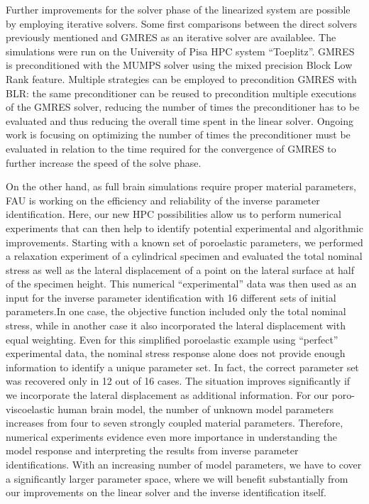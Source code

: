 \documentclass[a4paper,12pt, numbers]{article}
\begin{document}
Further improvements for the solver phase of the linearized system are possible by employing iterative solvers. Some first comparisons between the direct solvers previously mentioned and GMRES as an iterative solver are availablee. The simulations were run on the University of Pisa HPC system ``Toeplitz''. GMRES is preconditioned with the MUMPS solver using the mixed precision Block Low Rank feature. Multiple strategies can be employed to precondition GMRES with BLR: the same preconditioner can be reused to precondition multiple executions of the GMRES solver, reducing the number of times the preconditioner has to be evaluated and thus reducing the overall time spent in the linear solver. Ongoing work is focusing on optimizing the number of times the preconditioner must be evaluated in relation to the time required for the convergence of GMRES to further increase the speed of the solve phase.

On the other hand, as full brain simulations require proper material parameters, FAU is working on the efficiency and reliability of the inverse parameter identification. Here, our new HPC possibilities allow us to perform numerical experiments that can then help to identify potential experimental and algorithmic improvements.  Starting with a known set of poroelastic parameters, we performed a relaxation experiment of a cylindrical specimen and evaluated the total nominal stress as well as the lateral displacement of a point on the lateral surface at half of the specimen height. This numerical ``experimental'' data was then used as an input for the inverse parameter identification with 16 different sets of initial parameters.In one case, the objective function included only the total nominal stress, while in another case it also incorporated the lateral displacement with equal weighting. Even for this simplified poroelastic example using ``perfect'' experimental data, the nominal stress response alone does not provide enough information to identify a unique parameter set. In fact, the correct parameter set was recovered only in 12 out of 16 cases. The situation improves significantly if we incorporate the lateral displacement as additional information.
For our poro-viscoelastic human brain model, the number of unknown model parameters increases from four to seven strongly coupled material parameters. Therefore, numerical experiments evidence even more importance in understanding the model response and interpreting the results from inverse parameter identifications. With an increasing number of model parameters, we have to cover a significantly larger parameter space, where we will benefit substantially from our improvements on the linear solver and the inverse identification itself.
\end{document}
